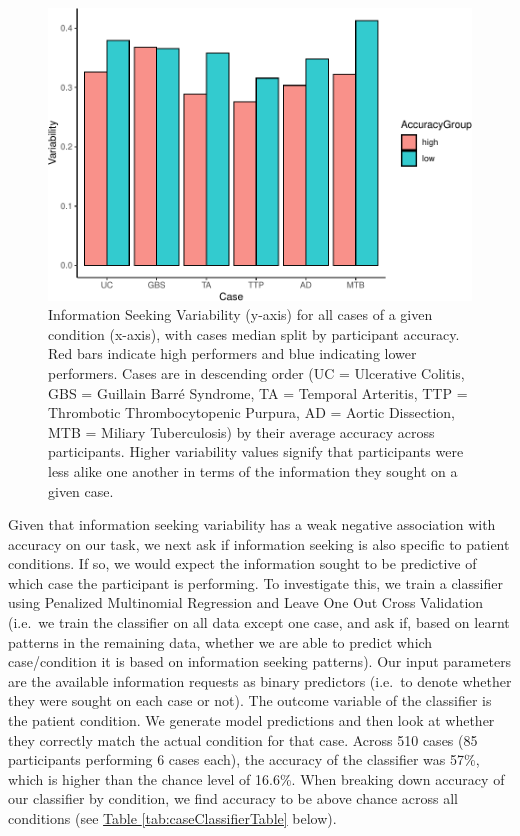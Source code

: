 \documentclass[a4paper, nobind]{templates/ociamthesis}
\begin{document}
\begin{figure}[H]

{\centering \includegraphics[width=1\linewidth]{_main_files/figure-latex/accVarSplitPlot-1} 

}

\caption[Online Study: Information Seeking Variability Split by Accuracy and Case (Bar Graph)]{Information Seeking Variability (y-axis) for all cases of a given condition (x-axis), with cases median split by participant accuracy. Red bars indicate high performers and blue indicating lower performers. Cases are in descending order (UC = Ulcerative Colitis, GBS = Guillain Barré Syndrome, TA = Temporal Arteritis, TTP = Thrombotic Thrombocytopenic Purpura, AD = Aortic Dissection, MTB = Miliary Tuberculosis) by their average accuracy across participants. Higher variability values signify that participants were less alike one another in terms of the information they sought on a given case.}\label{fig:accVarSplitPlot}
\end{figure}

Given that information seeking variability has a weak negative association with accuracy on our task, we next ask if information seeking is also specific to patient conditions. If so, we would expect the information sought to be predictive of which case the participant is performing. To investigate this, we train a classifier using Penalized Multinomial Regression and Leave One Out Cross Validation (i.e.~we train the classifier on all data except one case, and ask if, based on learnt patterns in the remaining data, whether we are able to predict which case/condition it is based on information seeking patterns). Our input parameters are the available information requests as binary predictors (i.e.~to denote whether they were sought on each case or not). The outcome variable of the classifier is the patient condition. We generate model predictions and then look at whether they correctly match the actual condition for that case. Across 510 cases (85 participants performing 6 cases each), the accuracy of the classifier was 57\%, which is higher than the chance level of 16.6\%. When breaking down accuracy of our classifier by condition, we find accuracy to be above chance across all conditions (see \hyperref[tab:caseClassifierTable]{Table \ref{tab:caseClassifierTable}} below).
\end{document}
